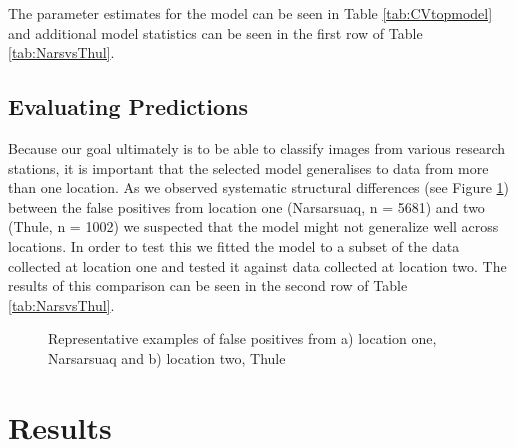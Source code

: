 \documentclass[12pt]{article}
\begin{document}
The parameter estimates for the model can be seen in Table \ref{tab:CVtopmodel} and additional model statistics can be seen in the first row of Table \ref{tab:NarsvsThul}.

\subsection{Evaluating Predictions}\label{modeleval}
Because our goal ultimately is to be able to classify images from various research stations, it is important that the selected model generalises to data from more than one location. As we observed systematic structural differences (see Figure \ref{fig:falsepositives}) between the false positives from location one (Narsarsuaq, n = 5681) and two (Thule, n = 1002) we suspected that the model might not generalize well across locations. In order to test this we fitted the model to a subset of the data collected at location one and tested it against data collected at location two. The results of this comparison can be seen in the second row of Table \ref{tab:NarsvsThul}.

\begin{figure}[ht]
	\begin{center}
		\hfill
		\caption{Representative examples of false positives from a) location one, Narsarsuaq and b) location two, Thule} 
		\label{fig:falsepositives}
	\end{center}
\end{figure}


\section{Results}
\end{document}
